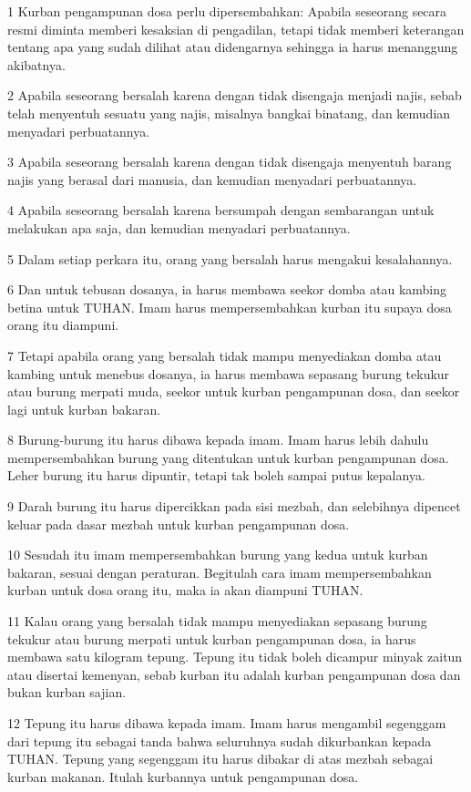 \par 1 Kurban pengampunan dosa perlu dipersembahkan: Apabila seseorang secara resmi diminta memberi kesaksian di pengadilan, tetapi tidak memberi keterangan tentang apa yang sudah dilihat atau didengarnya sehingga ia harus menanggung akibatnya.
\par 2 Apabila seseorang bersalah karena dengan tidak disengaja menjadi najis, sebab telah menyentuh sesuatu yang najis, misalnya bangkai binatang, dan kemudian menyadari perbuatannya.
\par 3 Apabila seseorang bersalah karena dengan tidak disengaja menyentuh barang najis yang berasal dari manusia, dan kemudian menyadari perbuatannya.
\par 4 Apabila seseorang bersalah karena bersumpah dengan sembarangan untuk melakukan apa saja, dan kemudian menyadari perbuatannya.
\par 5 Dalam setiap perkara itu, orang yang bersalah harus mengakui kesalahannya.
\par 6 Dan untuk tebusan dosanya, ia harus membawa seekor domba atau kambing betina untuk TUHAN. Imam harus mempersembahkan kurban itu supaya dosa orang itu diampuni.
\par 7 Tetapi apabila orang yang bersalah tidak mampu menyediakan domba atau kambing untuk menebus dosanya, ia harus membawa sepasang burung tekukur atau burung merpati muda, seekor untuk kurban pengampunan dosa, dan seekor lagi untuk kurban bakaran.
\par 8 Burung-burung itu harus dibawa kepada imam. Imam harus lebih dahulu mempersembahkan burung yang ditentukan untuk kurban pengampunan dosa. Leher burung itu harus dipuntir, tetapi tak boleh sampai putus kepalanya.
\par 9 Darah burung itu harus dipercikkan pada sisi mezbah, dan selebihnya dipencet keluar pada dasar mezbah untuk kurban pengampunan dosa.
\par 10 Sesudah itu imam mempersembahkan burung yang kedua untuk kurban bakaran, sesuai dengan peraturan. Begitulah cara imam mempersembahkan kurban untuk dosa orang itu, maka ia akan diampuni TUHAN.
\par 11 Kalau orang yang bersalah tidak mampu menyediakan sepasang burung tekukur atau burung merpati untuk kurban pengampunan dosa, ia harus membawa satu kilogram tepung. Tepung itu tidak boleh dicampur minyak zaitun atau disertai kemenyan, sebab kurban itu adalah kurban pengampunan dosa dan bukan kurban sajian.
\par 12 Tepung itu harus dibawa kepada imam. Imam harus mengambil segenggam dari tepung itu sebagai tanda bahwa seluruhnya sudah dikurbankan kepada TUHAN. Tepung yang segenggam itu harus dibakar di atas mezbah sebagai kurban makanan. Itulah kurbannya untuk pengampunan dosa.
